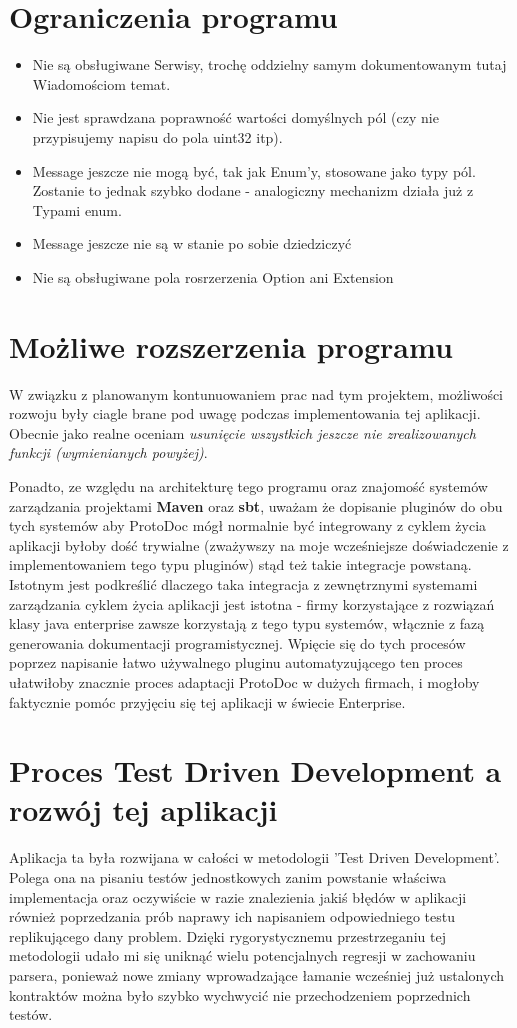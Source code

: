 \documentclass[a4paper]{article}
\begin{document}
\newpage
\section{Ograniczenia programu}
\begin{itemize}
 \item Nie są obsługiwane Serwisy, trochę oddzielny samym dokumentowanym tutaj Wiadomościom temat.
 \item Nie jest sprawdzana poprawność wartości domyślnych pól (czy nie przypisujemy napisu do pola uint32 itp).
 \item Message jeszcze nie mogą być, tak jak Enum'y, stosowane jako typy pól. Zostanie to jednak szybko dodane - analogiczny mechanizm działa już z Typami enum.
 \item Message jeszcze nie są w stanie po sobie dziedziczyć
 \item Nie są obsługiwane pola rosrzerzenia Option ani Extension
\end{itemize}

\newpage
\section{Możliwe rozszerzenia programu}
W związku z planowanym kontunuowaniem prac nad tym projektem, możliwości rozwoju były ciagle brane pod uwagę
podczas implementowania tej aplikacji. Obecnie jako realne oceniam \textit{usunięcie wszystkich jeszcze nie zrealizowanych funkcji 
(wymienianych powyżej)}. 

Ponadto, ze względu na architekturę tego programu oraz znajomość systemów zarządzania projektami \textbf{Maven} oraz \textbf{sbt},
uważam że dopisanie pluginów do obu tych systemów aby ProtoDoc mógł normalnie być integrowany z cyklem życia aplikacji byłoby dość trywialne 
(zważywszy na moje wcześniejsze doświadczenie z implementowaniem tego typu pluginów) stąd też takie integracje powstaną. Istotnym jest podkreślić dlaczego
taka integracja z zewnętrznymi systemami zarządzania cyklem życia aplikacji jest istotna - firmy korzystające z rozwiązań klasy java enterprise zawsze 
korzystają z tego typu systemów, włącznie z fazą generowania dokumentacji programistycznej. Wpięcie się do tych procesów poprzez napisanie łatwo używalnego
pluginu automatyzującego ten proces ułatwiłoby znacznie proces adaptacji ProtoDoc w dużych firmach, i mogłoby faktycznie pomóc przyjęciu się tej aplikacji w świecie Enterprise.

\newpage
\section{Proces Test Driven Development a rozwój tej aplikacji}
Aplikacja ta była rozwijana w całości w metodologii 'Test Driven Development'. Polega ona na pisaniu testów jednostkowych
zanim powstanie właściwa implementacja oraz oczywiście w razie znalezienia jakiś błędów w aplikacji również poprzedzania prób 
naprawy ich napisaniem odpowiedniego testu replikującego dany problem. Dzięki rygorystycznemu przestrzeganiu tej metodologii
udało mi się uniknąć wielu potencjalnych regresji w zachowaniu parsera, ponieważ nowe zmiany wprowadzające łamanie wcześniej 
już ustalonych kontraktów można było szybko wychwycić nie przechodzeniem poprzednich testów. 
\end{document}
